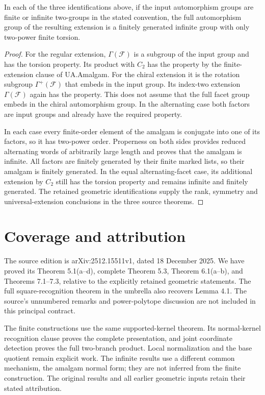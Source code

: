\begin{theorem}
In each of the three identifications above, if the input automorphism groups
are finite or infinite two-groups in the stated convention, the full
automorphism group of the resulting extension is a finitely generated
infinite group with only two-power finite torsion.
\end{theorem}
\begin{proof}
For the regular extension, $\Gamma(\mathcal F)$ is a subgroup of the input
group and has the torsion property. Its product with $C_2$ has the property
by the finite-extension clause of UA.Amalgam. For the chiral extension it
is the rotation subgroup $\Gamma^+(\mathcal F)$ that embeds in the input
group. Its index-two extension $\Gamma(\mathcal F)$ again has the
property. This does not assume that the full facet group embeds in the
chiral automorphism group. In the alternating case both factors are input
groups and already have the required property.

In each case every finite-order element of the amalgam is conjugate into
one of its factors, so it has two-power order. Properness on both sides
provides reduced alternating words of arbitrarily large length and proves
that the amalgam is infinite. All factors are finitely generated by their
finite marked lists, so their amalgam is finitely generated. In the equal
alternating-facet case, its additional extension by $C_2$ still has the
torsion property and remains infinite and finitely generated. The retained
geometric identifications supply the rank, symmetry and universal-extension
conclusions in the three source theorems.
\end{proof}

\section{Coverage and attribution}
The source edition is arXiv:2512.15511v1, dated 18 December 2025. We have
proved its Theorem 5.1(a--d), complete Theorem 5.3, Theorem 6.1(a--b), and
Theorems 7.1--7.3, relative to the explicitly retained geometric statements.
The full square-recognition theorem in the umbrella also recovers
Lemma 4.1. The source's unnumbered remarks and power-polytope
discussion are not included in this principal contract.

The finite constructions use the same supported-kernel theorem. Its
normal-kernel recognition clause proves the complete presentation, and
joint coordinate detection proves the full two-branch product. Local
normalization and the base quotient remain explicit work. The infinite
results use a different common mechanism, the amalgam normal form; they
are not inferred from the finite construction. The original results and
all earlier geometric inputs retain their stated attribution.

